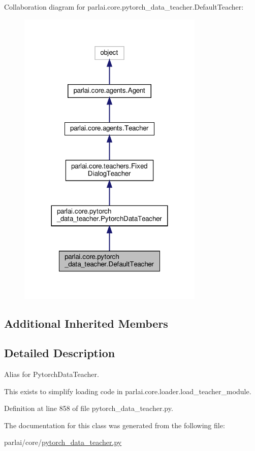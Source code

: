 Collaboration diagram for parlai.\+core.\+pytorch\+\_\+data\+\_\+teacher.\+Default\+Teacher\+:\nopagebreak
\begin{figure}[H]
\begin{center}
\leavevmode
\includegraphics[width=251pt]{d9/df5/classparlai_1_1core_1_1pytorch__data__teacher_1_1DefaultTeacher__coll__graph}
\end{center}
\end{figure}
\subsection*{Additional Inherited Members}


\subsection{Detailed Description}
\begin{DoxyVerb}Alias for PytorchDataTeacher.

This exists to simplify loading code in parlai.core.loader.load_teacher_module.
\end{DoxyVerb}
 

Definition at line 858 of file pytorch\+\_\+data\+\_\+teacher.\+py.



The documentation for this class was generated from the following file\+:\begin{DoxyCompactItemize}
\item 
parlai/core/\hyperlink{pytorch__data__teacher_8py}{pytorch\+\_\+data\+\_\+teacher.\+py}\end{DoxyCompactItemize}
